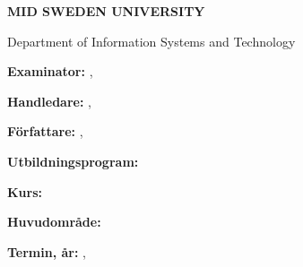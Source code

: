 \thispagestyle{empty}
\setcounter{page}{2}
    \textbf{MID SWEDEN UNIVERSITY}
    
    Department of Information Systems and Technology
    
    \vspace{0.5cm}
    
    \textbf{Examinator:} \examinerName, \examinerEmail
    
    \textbf{Handledare:} \supervisorName, \supervisorEmail
    
    \textbf{Författare:} \thesisAuthor, \thesisAuthorEmail
    
    \textbf{Utbildningsprogram:} \degreeProgramme
    
    \textbf{Kurs:} \courseName 
    
    \textbf{Huvudområde:} \mainFieldOfStudy
    
    \textbf{Termin, år:} \semester, \thesisYear
\restoregeometry